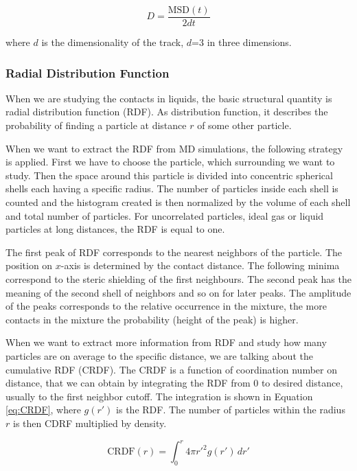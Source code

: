 \begin{equation}\label{eq:Di}
	D = \frac{\text{MSD}(t)}{2dt}
\end{equation}

where $d$ is the dimensionality of the track, $d$=3 in three dimensions.

\subsubsection{Radial Distribution Function}
When we are studying the contacts in liquids, the basic structural quantity is radial distribution function (RDF). As distribution function, it describes the probability of finding a particle at distance $r$ of some other particle. \cite{mdskripta} 

When we want to extract the RDF from MD simulations, the following strategy is applied. First we have to choose the particle, which surrounding we want to study. Then the space around this particle is divided into concentric spherical shells each having a specific radius. The number of particles inside each shell is counted and the histogram created is then normalized by the volume of each shell and total number of particles. For uncorrelated particles, ideal gas or liquid particles at long distances, the RDF is equal to one. 

The first peak of RDF corresponds to the nearest neighbors of the particle. The position on $x$-axis is determined by the contact distance. The following minima correspond to the steric shielding of the first neighbours. The second peak has the meaning of the second shell of neighbors and so on for later peaks. The amplitude of the peaks corresponds to the relative occurrence in the mixture, the more contacts in the mixture the probability (height of the peak) is higher. \cite{mdskripta}

When we want to extract more information from RDF and study how many particles are on average to the specific distance, we are talking about the cumulative RDF (CRDF). The CRDF is a function of coordination number on distance, that we can obtain by integrating the RDF from 0 to desired distance, usually to the first neighbor cutoff. The integration is shown in Equation \ref{eq:CRDF}, where $g(r')$ is the RDF. The number of particles within the radius $r$ is then CDRF multiplied by density.~\cite{mdskripta}

\begin{equation}\label{eq:CRDF}
	\text{CRDF}(r) = \int_{0}^{r} 4\pi r'^2 g(r') \, dr'
\end{equation}

